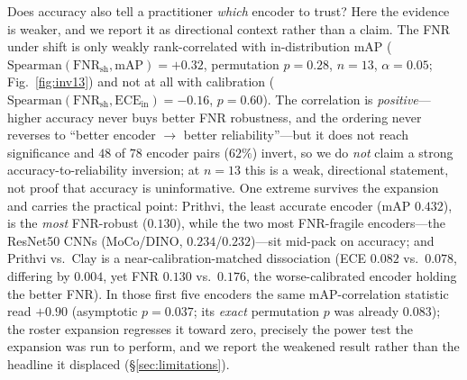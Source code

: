 \documentclass[11pt]{article}
\begin{document}
Does accuracy also tell a practitioner \emph{which} encoder to trust? Here the evidence is weaker, and we
report it as directional context rather than a claim. The FNR under shift is only weakly rank-correlated
with in-distribution mAP
($\mathrm{Spearman}(\mathrm{FNR}_{\mathrm{sh}},\mathrm{mAP})=+0.32$, permutation $p{=}0.28$, $n{=}13$,
$\alpha{=}0.05$; Fig.~\ref{fig:inv13}) and not at all with calibration
($\mathrm{Spearman}(\mathrm{FNR}_{\mathrm{sh}},\mathrm{ECE}_{\mathrm{in}})=-0.16$, $p{=}0.60$). The
correlation is \emph{positive}---higher accuracy never buys better FNR robustness, and the ordering never
reverses to ``better encoder $\to$ better reliability''---but it does not reach significance and $48$ of
$78$ encoder pairs ($62\%$) invert, so we do \emph{not} claim a strong accuracy-to-reliability inversion;
at $n{=}13$ this is a weak, directional statement, not proof that accuracy is uninformative. One extreme
survives the expansion and carries the practical point: Prithvi, the least accurate encoder (mAP
$0.432$), is the \emph{most} FNR-robust ($0.130$), while the two most FNR-fragile encoders---the ResNet50
CNNs (MoCo/DINO, $0.234$/$0.232$)---sit mid-pack on accuracy; and Prithvi vs.\ Clay is a
near-calibration-matched dissociation (ECE $0.082$ vs.\ $0.078$, differing by $0.004$, yet FNR $0.130$
vs.\ $0.176$, the worse-calibrated encoder holding the better FNR). In those first five encoders the same
mAP-correlation statistic read $+0.90$ (asymptotic $p{=}0.037$; its \emph{exact} permutation $p$ was
already $0.083$); the roster expansion regresses it toward zero, precisely the power test the expansion
was run to perform, and we report the weakened result rather than the headline it displaced
(\S\ref{sec:limitations}).
\end{document}
